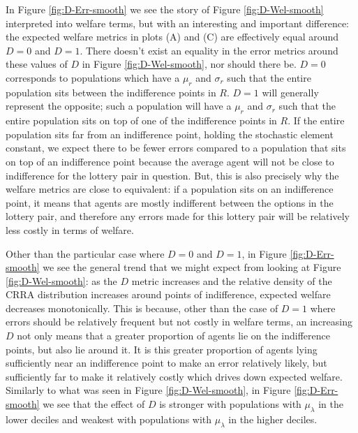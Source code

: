 \documentclass[../main.tex]{subfiles}
\begin{document}
In Figure \ref{fig:D-Err-smooth} we see the story of Figure \ref{fig:D-Wel-smooth} interpreted into welfare terms, but with an interesting and important difference: the expected welfare metrics in plots (A) and (C) are effectively equal around $D=0$ and $D=1$.
There doesn't exist an equality in the error metrics around these values of $D$ in Figure \ref{fig:D-Wel-smooth}, nor should there be.
$D=0$ corresponds to populations which have a $\mu_r$ and $\sigma_r$ such that the entire population sits between the indifference points in $R$.
$D=1$ will generally{\footnotemark} represent the opposite; such a population will have a $\mu_r$ and $\sigma_r$ such that the entire population sits on top of one of the indifference points in $R$.
If the entire population sits far from an indifference point, holding the stochastic element constant, we expect there to be fewer errors compared to a population that sits on top of an indifference point because the average agent will not be close to indifference for the lottery pair in question.
But, this is also precisely why the welfare metrics are close to equivalent: if a population sits on an indifference point, it means that agents are mostly indifferent between the options in the lottery pair, and therefore any errors made for this lottery pair will be relatively less costly in terms of welfare.

\addtocounter{footnote}{-1}

Other than the particular case where $D=0$ and $D=1$, in Figure \ref{fig:D-Err-smooth} we see the general trend that we might expect from looking at Figure \ref{fig:D-Wel-smooth}: as the $D$ metric increases and the relative density of the CRRA distribution increases around points of indifference, expected welfare decreases monotonically.
This is because, other than the case of $D=1$ where errors should be relatively frequent but not costly in welfare terms, an increasing $D$ not only means that a greater proportion of agents lie on the indifference points, but also lie around it.
It is this greater proportion of agents lying sufficiently near an indifference point to make an error relatively likely, but sufficiently far to make it relatively costly which drives down expected welfare.
Similarly to what was seen in Figure \ref{fig:D-Wel-smooth}, in Figure \ref{fig:D-Err-smooth} we see that the effect of $D$ is stronger with populations with $\mu_\lambda$ in the lower deciles and weakest with populations with $\mu_\lambda$ in the higher deciles.
\end{document}
